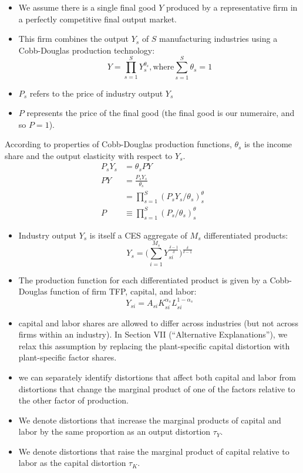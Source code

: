 \documentclass{article}
\begin{document}
\begin{itemize}
    \item We assume there is a single final good $Y$ produced by a representative firm in a perfectly competitive final output market. 
    \item This firm combines the output $Y_s$ of $S$ manufacturing industries using a Cobb-Douglas production technology:
    \begin{equation*}
        Y=\prod^{S}_{s=1}Y^{\theta_s}_s, \text{where} \sum^S_{s=1}\theta_s=1
   \end{equation*}
   \item $P_s$ refers to the price of industry output $Y_s$
   \item $P$ represents the price of the final good (the final good
   is our numeraire, and so $P = 1$). 
\end{itemize}

According to properties of Cobb-Douglas production functions, $\theta_s$ is the income share and the output elasticity with respect to $Y_s$.
\begin{align*}
    P_sY_s&=\theta_sPY \\
    PY&=\frac{P_sY_s}{\theta_s}\\
    &=\prod^{S}_{s=1}(P_sY_s/\theta_s)^\theta_s\\
    P&\equiv \prod^{S}_{s=1} (P_s/\theta_s)^\theta_s
\end{align*}

\begin{itemize}
    \item Industry output $Y_s$ is itself a CES aggregate of $M_s$ differentiated products:
    \begin{equation*}
        Y_s=\biggl(\sum_{i=1}^{M_s}Y_{si}^{\frac{\delta-1}{\delta }}\biggr)^\frac{\delta}{\delta-1}
    \end{equation*}
    \item The production function for each differentiated product is given by a Cobb-Douglas function of firm TFP, capital, and labor:
    \begin{equation*}
        Y_{si}=A_{si}K_{si}^{\alpha_s}L_{si}^{1-\alpha_s}
    \end{equation*}
    \item capital and labor shares are allowed to differ across industries (but not across firms within an industry). In Section VII (“Alternative Explanations”), we relax this assumption by replacing the plant-specific capital distortion with plant-specific factor shares.
    \item we can separately identify distortions that affect both capital and labor from distortions that change the marginal product of one of the factors relative to the other factor of production. 
    \item We denote distortions that increase the marginal products of capital and labor by the same proportion as an output distortion $\tau_Y$. 
    \item We denote distortions that raise the marginal product of capital relative to labor as the capital distortion $\tau_K$.
\end{itemize}
\end{document}
